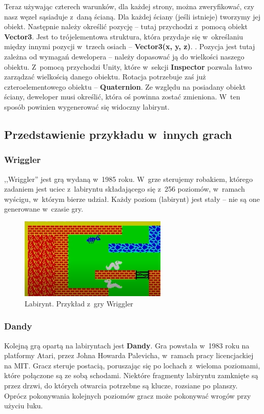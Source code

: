 \documentclass[oneside,polski,logo]{amuthesis}
\begin{document}
Teraz używając czterech warunków, dla każdej strony, można zweryfikować, czy nasz węzeł sąsiaduje z~daną ścianą. Dla każdej ściany (jeśli istnieje) tworzymy jej obiekt. Następnie należy określić pozycję – tutaj przychodzi z~pomocą obiekt \textbf{Vector3}. Jest to trójelementowa struktura, która przydaje się w~określaniu między innymi pozycji w~trzech osiach – \textbf{Vector3(x, y, z)}. \cite{Vector3}. Pozycja jest tutaj zależna od wymagań dewelopera – należy dopasować ją do wielkości naszego obiektu. Z~pomocą przychodzi Unity, które w~sekcji \textbf{Inspector} pozwala łatwo zarządzać wielkością danego obiektu. Rotacja potrzebuje zaś już czteroelementowego obiektu – \textbf{Quaternion}. Ze względu na posiadany obiekt ściany, deweloper musi określić, która oś powinna zostać zmieniona. W~ten sposób powinien wygenerować się widoczny labirynt.

\subsection{Przedstawienie przykładu w~innych grach}
\subsubsection{Wriggler}
\par ,,Wriggler'' jest grą wydaną w~1985 roku. W~grze sterujemy robakiem, którego zadaniem jest uciec z~labiryntu składającego się z~256 poziomów, w~ramach wyścigu, w~którym bierze udział. Każdy poziom (labirynt) jest stały – nie są one generowane w~czasie gry.  \cite{Wriggler}


\begin{figure}[h!]
	\centering
	\includegraphics[width=7cm]{images/tyrek/wriggler.png}
	\caption{Labirynt. Przykład z~gry Wriggler}
\end{figure}

\subsubsection{Dandy}
\par Kolejną grą opartą na labiryntach jest \textbf{Dandy}. Gra powstała w~1983 roku na platformy Atari, przez Johna Howarda Palevicha, w~ramach pracy licencjackiej na MIT. Gracz steruje postacią, poruszając się po lochach z~wieloma poziomami, które połączone są ze sobą schodami. Niektóre fragmenty labiryntu zamknięte są przez drzwi, do których otwarcia potrzebne są klucze, rozsiane po planszy. Oprócz pokonywania kolejnych poziomów gracz może pokonywać wrogów przy użyciu łuku. \cite{Dandy}
\clearpage
\end{document}
